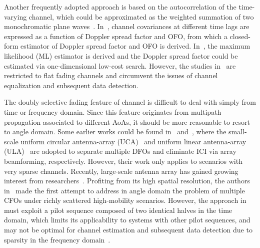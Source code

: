 \documentclass[12pt, draftclsnofoot, onecolumn]{IEEEtran}
\begin{document}
Another frequently adopted approach is based on the autocorrelation of the time-varying channel, which could be approximated as the weighted summation of two monochromatic plane waves~\cite{M_Souden2009TSP, F_Bellili2013GLOBECOM, YR_Tsai2009SPL}. In~\cite{M_Souden2009TSP}, channel covariances at different time lags are expressed as a function of Doppler spread factor and OFO, from which a closed-form estimator of Doppler spread factor and OFO is derived. In~\cite{F_Bellili2013GLOBECOM}, the maximum likelihood (ML) estimator is derived and the Doppler spread factor could be estimated via one-dimensional low-cost search. %
However, the studies in~\cite{M_Souden2009TSP, F_Bellili2013GLOBECOM, YR_Tsai2009SPL} are restricted to flat fading channels and circumvent the issues of channel equalization and subsequent data detection.

The doubly selective fading feature of channel is difficult to deal with simply from time or frequency domain. Since this feature originates from multipath propagation associated to different AoAs, it should be more reasonable to resort to angle domain. Some earlier works could be found in~\cite{Y_Zhang2011ICST} and~\cite{W_Guo2013ICSPCC}, where the small-scale uniform circular antenna-array (UCA)~\cite{Y_Zhang2011ICST} and uniform linear antenna-array (ULA)~\cite{W_Guo2013ICSPCC} are adopted  to separate multiple DFOs and eliminate ICI via array beamforming, respectively. However, their work only applies to scenarios with very sparse channels.
Recently, large-scale antenna array has gained growing interest from researchers~\cite{EG_Larsson2014CM, W_Zhang2018TWC, H_Xie2016JSAC}. Profiting from its high spatial resolution, the authors in~\cite{W_Guo2017TVT} made the first attempt to address in angle domain the problem of multiple CFOs under richly scattered high-mobility scenarios. However, the approach in~\cite{W_Guo2017TVT} must exploit a pilot sequence composed of two identical halves in the time domain, which limits its applicability to systems with other pilot sequences, and may not be optimal for channel estimation and subsequent data detection due to sparsity in the frequency domain~\cite{H_Minn2006TC}.
\end{document}
